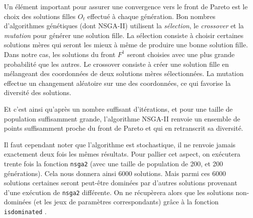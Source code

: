 Un élément important pour assurer une convergence vers le front de Pareto est le choix des solutions filles $O_t$ effectué à chaque génération.
Bon nombres d'algorithmes génétiques (dont NSGA-II) utilisent la \emph{sélection}, le \emph{crossover} et la \emph{mutation} pour générer une solution fille.
La sélection consiste à choisir certaines solutions mères qui seront les mieux à même de produire une bonne solution fille.
Dans notre cas, les solutions du front $F^1$ seront choisies avec une plus grande probabilité que les autres.
Le crossover consiste à créer une solution fille en mélangeant des coordonnées de deux solutions mères sélectionnées.
La mutation effectue un changement aléatoire sur une des coordonnées, ce qui favorise la diversité des solutions.



Et c'est ainsi qu'après un nombre suffisant d'itérations, et pour une taille de population suffisamment grande, l'algorithme NSGA-II renvoie un ensemble de points suffisamment proche du front de Pareto et qui en retranscrit sa diversité.

Il faut cependant noter que l'algorithme est stochastique, il ne renvoie jamais exactement deux fois les mêmes résultats.
Pour pallier cet aspect, on exécutera trente fois la fonction \texttt{nsga2} \citep{nsga} (avec une taille de population de 200, et 200 générations).
Cela nous donnera ainsi 6000 solutions.
Mais parmi ces 6000 solutions certaines seront peut-être dominées par d'autres solutions provenant d'une exécution de \texttt{nsga2} différente.
On ne récupèrera alors que les solutions non-dominées (et les jeux de paramètres correspondants) grâce à la fonction \texttt{is\textunderscore dominated} \citep{emoa}.

